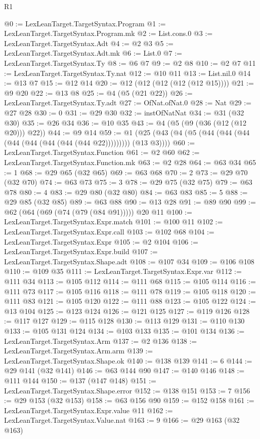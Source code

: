 \begin{lexlean}{R1}
\begin{coremodule}
@0 := LexLeanTarget.TargetSyntax.Program
@1 := LexLeanTarget.TargetSyntax.Program.mk
@2 := List.cons.{0}
@3 := LexLeanTarget.TargetSyntax.Adt
@4 := @2 @3
@5 := LexLeanTarget.TargetSyntax.Adt.mk
@6 := List.{0}
@7 := LexLeanTarget.TargetSyntax.Ty
@8 := @6 @7
@9 := @2 @8
@10 := @2 @7
@11 := LexLeanTarget.TargetSyntax.Ty.nat
@12 := @10 @11
@13 := List.nil.{0}
@14 := @13 @7
@15 := @12 @14
@20 := @12 (@12 (@12 (@12 (@12 @15))))
@21 := @9 @20
@22 := @13 @8
@25 := @4 (@5 (@21 @22))
@26 := LexLeanTarget.TargetSyntax.Ty.adt
@27 := OfNat.ofNat.{0}
@28 := Nat
@29 := @27 @28
@30 := 0
@31 := @29 @30
@32 := instOfNatNat
@34 := @31 (@32 @30)
@35 := @26 @34
@36 := @10 @35
@43 := @4 (@5 (@9 (@36 (@12 (@12 @20))) @22))
@44 := @9 @14
@59 := @1 (@25 (@43 (@4 (@5 (@44 (@44 (@44 (@44 (@44 (@44 (@44 (@44 @22))))))))) (@13 @3))))
@60 := LexLeanTarget.TargetSyntax.Function
@61 := @2 @60
@62 := LexLeanTarget.TargetSyntax.Function.mk
@63 := @2 @28
@64 := @63 @34
@65 := 1
@68 := @29 @65 (@32 @65)
@69 := @63 @68
@70 := 2
@73 := @29 @70 (@32 @70)
@74 := @63 @73
@75 := 3
@78 := @29 @75 (@32 @75)
@79 := @63 @78
@80 := 4
@83 := @29 @80 (@32 @80)
@84 := @63 @83
@85 := 5
@88 := @29 @85 (@32 @85)
@89 := @63 @88
@90 := @13 @28
@91 := @89 @90
@99 := @62 (@64 (@69 (@74 (@79 (@84 @91))))) @20 @11
@100 := LexLeanTarget.TargetSyntax.Expr.match
@101 := @100 @11
@102 := LexLeanTarget.TargetSyntax.Expr.call
@103 := @102 @68
@104 := LexLeanTarget.TargetSyntax.Expr
@105 := @2 @104
@106 := LexLeanTarget.TargetSyntax.Expr.build
@107 := LexLeanTarget.TargetSyntax.Shape.adt
@108 := @107 @34
@109 := @106 @108
@110 := @109 @35
@111 := LexLeanTarget.TargetSyntax.Expr.var
@112 := @111 @34
@113 := @105 @112
@114 := @111 @68
@115 := @105 @114
@116 := @111 @73
@117 := @105 @116
@118 := @111 @78
@119 := @105 @118
@120 := @111 @83
@121 := @105 @120
@122 := @111 @88
@123 := @105 @122
@124 := @13 @104
@125 := @123 @124
@126 := @121 @125
@127 := @119 @126
@128 := @117 @127
@129 := @115 @128
@130 := @113 @129
@131 := @110 @130
@133 := @105 @131 @124
@134 := @103 @133
@135 := @101 @134
@136 := LexLeanTarget.TargetSyntax.Arm
@137 := @2 @136
@138 := LexLeanTarget.TargetSyntax.Arm.arm
@139 := LexLeanTarget.TargetSyntax.Shape.ok
@140 := @138 @139
@141 := 6
@144 := @29 @141 (@32 @141)
@146 := @63 @144 @90
@147 := @140 @146
@148 := @111 @144
@150 := @137 (@147 @148)
@151 := LexLeanTarget.TargetSyntax.Shape.error
@152 := @138 @151
@153 := 7
@156 := @29 @153 (@32 @153)
@158 := @63 @156 @90
@159 := @152 @158
@161 := LexLeanTarget.TargetSyntax.Expr.value @11
@162 := LexLeanTarget.TargetSyntax.Value.nat
@163 := 9
@166 := @29 @163 (@32 @163)

\end{coremodule}
\end{lexlean}
